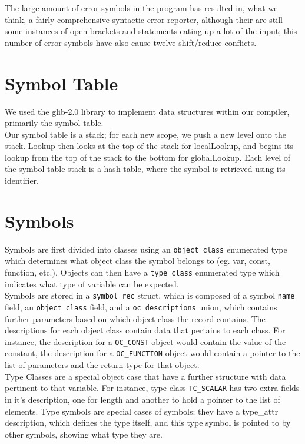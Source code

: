 \documentclass{report}
\begin{document}
The large amount of error symbols in the program has resulted in, what we think, a fairly comprehensive syntactic error reporter, although their are still some instances of open brackets and statements eating up a lot of the input; this number of error symbols have also cause twelve shift/reduce conflicts.


\section*{Symbol Table}
We used the glib-2.0 library to implement data structures within our compiler, primarily the symbol table.\\
Our symbol table is a stack; for each new scope, we push a new level onto the stack. Lookup then looks at the top of the stack for localLookup, and begins its lookup from the top of the stack to the bottom for globalLookup. Each level of the symbol table stack is a hash table, where the symbol is retrieved using its identifier.\\


\section*{Symbols}
Symbols are first divided into classes using an \texttt{object\_class} enumerated type which determines what object class the symbol belongs to (eg. var, const, function, etc.). Objects can then have a \texttt{type\_class} enumerated type which indicates what type of variable can be expected. \\
Symbols are stored in a \texttt{symbol\_rec} struct, which is composed of a symbol \texttt{name} field, an \texttt{object\_class} field, and a \texttt{oc\_descriptions} union, which contains further parameters based on which object class the record contains. The descriptions for each object class contain data that pertains to each class. For instance, the description for a \texttt{OC\_CONST} object would contain the value of the constant, the description for a \texttt{OC\_FUNCTION} object would contain a pointer to the list of parameters and the return type for that object.\\
Type Classes are a special object case that have a further structure with data pertinent to that variable. For instance, type class \texttt{TC\_SCALAR} has two extra fields in it's description, one for length and another to hold a pointer to the list of elements. Type symbols are special cases of symbols; they have a type\_attr description, which defines the type itself, and this type symbol is pointed to by other symbols, showing what type they are.\\
\end{document}
